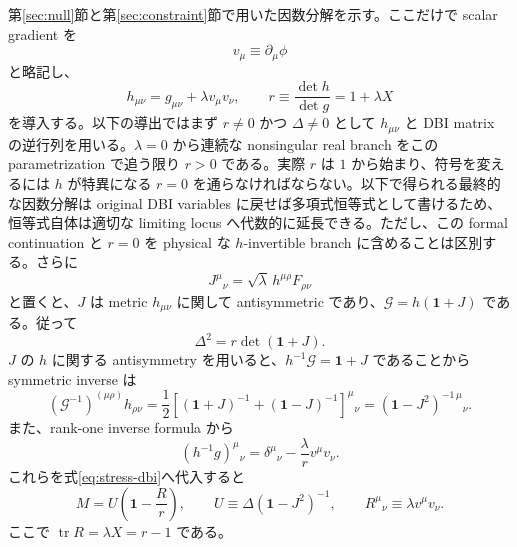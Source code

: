 \documentclass[a4paper,11pt]{ltjsarticle}
\numberwithin{equation}{section}
\newcommand{\tr}{\operatorname{tr}}
\newcommand{\G}{\mathcal G}
\newcommand{\Id}{\mathbf 1}
\begin{document}
第\ref{sec:null}節と第\ref{sec:constraint}節で用いた因数分解を示す。ここだけで scalar gradient を
\begin{equation}
 v_\mu\equiv\partial_\mu\phi
\end{equation}
と略記し、
\begin{equation}
 h_{\mu\nu}=g_{\mu\nu}+\lambda v_\mu v_\nu,
 \qquad
 r\equiv\frac{\det h}{\det g}=1+\lambda X
 \label{eq:h-r-app}
\end{equation}
を導入する。以下の導出ではまず $r\neq0$ かつ $\Delta\neq0$ として $h_{\mu\nu}$ と DBI matrix の逆行列を用いる。$\lambda=0$ から連続な nonsingular real branch をこの parametrization で追う限り $r>0$ である。実際 $r$ は $1$ から始まり、符号を変えるには $h$ が特異になる $r=0$ を通らなければならない。以下で得られる最終的な因数分解は original DBI variables に戻せば多項式恒等式として書けるため、恒等式自体は適切な limiting locus へ代数的に延長できる。ただし、この formal continuation と $r=0$ を physical な $h$-invertible branch に含めることは区別する。さらに
\begin{equation}
 J^\mu{}_{\nu}=\sqrt\lambda\,h^{\mu\rho}F_{\rho\nu}
 \label{eq:J-app}
\end{equation}
と置くと、$J$ は metric $h_{\mu\nu}$ に関して antisymmetric であり、$\G=h(\Id+J)$ である。従って
\begin{equation}
 \Delta^2=r\det(\Id+J).
 \label{eq:Delta-J-app}
\end{equation}
$J$ の $h$ に関する antisymmetry を用いると、$h^{-1}\G=\Id+J$ であることから symmetric inverse は
\begin{equation}
 (\G^{-1})^{(\mu\rho)}h_{\rho\nu}
 =\frac12\left[(\Id+J)^{-1}+(\Id-J)^{-1}\right]^\mu{}_{\nu}
 =(\Id-J^2)^{-1\,\mu}{}_{\nu}.
 \label{eq:symmetric-inverse-app}
\end{equation}
また、rank-one inverse formula から
\begin{equation}
 (h^{-1}g)^\mu{}_{\nu}
 =\delta^\mu{}_{\nu}-\frac{\lambda}{r}v^\mu v_\nu.
 \label{eq:hinvg-app}
\end{equation}
これらを式\eqref{eq:stress-dbi}へ代入すると
\begin{equation}
 M=U\left(\Id-\frac{R}{r}\right),
 \qquad
 U\equiv\Delta(\Id-J^2)^{-1},
 \qquad
 R^\mu{}_{\nu}\equiv\lambda v^\mu v_\nu.
 \label{eq:M-U-R-app}
\end{equation}
ここで $\tr R=\lambda X=r-1$ である。
\end{document}
